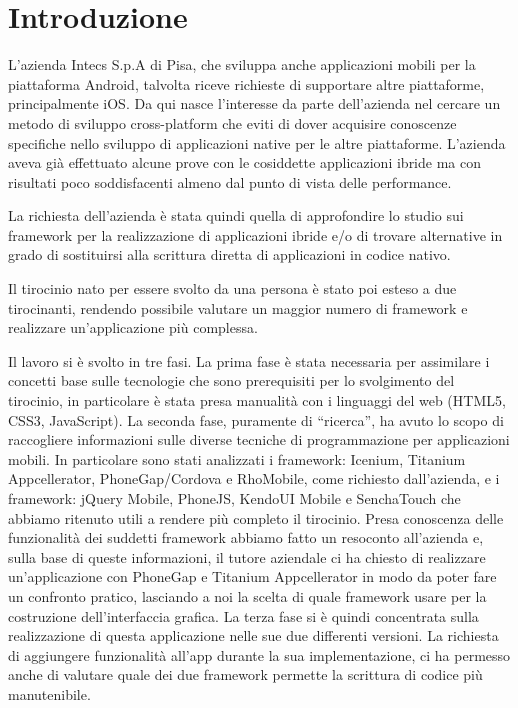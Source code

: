 \chapter{Introduzione}
	L'azienda Intecs S.p.A di Pisa, che sviluppa anche applicazioni mobili per la 
	piattaforma Android, talvolta riceve richieste di supportare altre piattaforme,
	principalmente iOS. Da qui nasce l'interesse da parte dell'azienda nel
	cercare un metodo di sviluppo cross-platform che eviti di dover acquisire 
	conoscenze specifiche nello sviluppo di applicazioni native per le altre 
	piattaforme. L'azienda aveva già effettuato alcune prove con le cosiddette
	applicazioni ibride ma con risultati poco soddisfacenti almeno dal punto di
	vista delle performance.
	
	La richiesta dell'azienda è stata quindi quella di approfondire lo studio sui
	framework per la realizzazione di applicazioni ibride e/o di trovare alternative
	in grado di sostituirsi alla scrittura diretta di applicazioni in codice 
	nativo.
	
	Il tirocinio nato per essere svolto da una persona è stato poi esteso a due
	tirocinanti, rendendo possibile valutare un maggior numero di framework e 
	realizzare un'applicazione più complessa.
	
	Il lavoro si è svolto in tre fasi. La prima fase è stata necessaria per 
	assimilare i concetti base sulle tecnologie che sono prerequisiti per lo 
	svolgimento del tirocinio, in particolare è stata presa manualità con i 
	linguaggi del web (HTML5, CSS3, JavaScript). La seconda fase, puramente di
	``ricerca'', ha avuto lo scopo di raccogliere informazioni sulle diverse 
	tecniche di programmazione per applicazioni mobili. In particolare sono 
	stati analizzati i framework: Icenium, Titanium Appcellerator, 
	PhoneGap/Cordova e RhoMobile, come richiesto dall'azienda, e i framework:
	jQuery Mobile, PhoneJS, KendoUI Mobile e SenchaTouch che abbiamo ritenuto
	utili a rendere più completo il tirocinio.
	Presa conoscenza delle funzionalità dei suddetti framework abbiamo fatto un
	resoconto all'azienda e, sulla base di queste informazioni, il tutore 
	aziendale ci ha chiesto di realizzare un'applicazione con PhoneGap e Titanium 
	Appcellerator in modo da poter fare un confronto pratico, lasciando a noi la
	scelta di quale framework usare per la costruzione dell'interfaccia grafica.
	La terza fase si è quindi concentrata sulla realizzazione di questa 
	applicazione nelle sue due differenti versioni. La richiesta di aggiungere
	funzionalità all'app durante la sua implementazione, ci ha permesso anche di 
	valutare quale dei due framework permette la scrittura di codice più 
	manutenibile.
	
